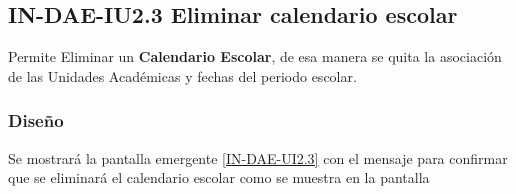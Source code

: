 \subsection{IN-DAE-IU2.3 Eliminar calendario escolar}

	Permite Eliminar un \textbf{Calendario Escolar}, de esa manera se quita la asociación de las Unidades Académicas y fechas del periodo escolar. 

\subsubsection{Diseño}

Se mostrará la pantalla emergente \ref{IN-DAE-UI2.3} con el mensaje  para confirmar que se eliminará el calendario escolar como se muestra en la pantalla 


